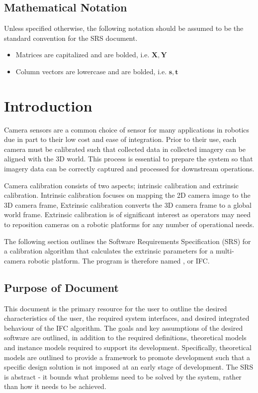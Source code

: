 \documentclass[12pt]{article}
\begin{document}
\subsection{Mathematical Notation}
Unless specified otherwise, the following notation should be assumed to be the standard 
convention for the SRS document.
\begin{itemize}
  \item Matrices are capitalized and are bolded, i.e. $\mathbf{X, Y}$
  \item Column vectors are lowercase and are bolded, i.e. $\mathbf{s, t}$
\end{itemize}

\newpage


\section{Introduction}
Camera sensors are a common choice of sensor for many applications in robotics due 
in part to their low cost and ease of integration. Prior to their use, each camera 
must be calibrated such that collected data in collected imagery can be aligned with 
the 3D world. This process is essential to prepare the system so that 
imagery data can be correctly captured and processed for downstream operations.

Camera calibration consists of two aspects; intrinsic calibration and extrinsic 
calibration. Intrinsic calibration focuses on mapping the 2D camera image 
to the 3D camera frame, Extrinsic calibration converts the 3D camera frame
to a global world frame. Extrinsic calibration is of significant interest as  
operators may need to reposition cameras on a robotic platforms for any number of 
operational needs.

The following section outlines the Software Requirements Specification (SRS) for 
a calibration algorithm that calculates the extrinsic parameters for a multi-camera 
robotic platform. The program is therefore named \progname, 
or IFC.


\subsection{Purpose of Document}

This document is the primary resource for the user to outline the desired 
characteristics of the user, the required system interfaces, and desired 
integrated behaviour of the IFC algorithm. The goals and key assumptions of the
desired software are outlined, in addition to the required definitions, 
theoretical models and instance models required to support its development. 
Specifically, theoretical models are outlined to provide a framework to promote 
development such that a specific design solution is not imposed at an early stage 
of development. The SRS is abstract - it bounds what problems need to be solved by 
the system, rather than how it needs to be achieved.
\end{document}
